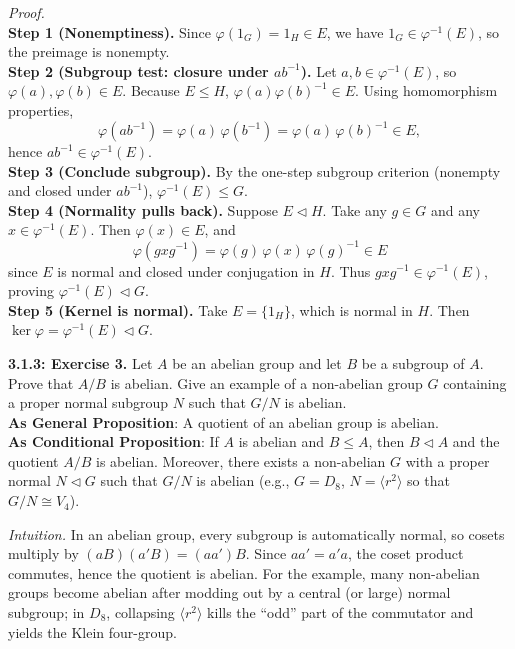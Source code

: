\documentclass[12pt]{article}
\theoremstyle{definition}
\begin{document}
\dotfill

\emph{Proof.}\\
\textbf{Step 1 (Nonemptiness).} Since $\varphi(1_G)=1_H\in E$, we have $1_G\in \varphi^{-1}(E)$, so the preimage is nonempty.\\
\textbf{Step 2 (Subgroup test: closure under $ab^{-1}$).} Let $a,b\in \varphi^{-1}(E)$, so $\varphi(a),\varphi(b)\in E$. Because $E\le H$, $\varphi(a)\varphi(b)^{-1}\in E$. Using homomorphism properties,
\[
\varphi(ab^{-1})=\varphi(a)\,\varphi(b^{-1})=\varphi(a)\,\varphi(b)^{-1}\in E,
\]
hence $ab^{-1}\in \varphi^{-1}(E)$.\\
\textbf{Step 3 (Conclude subgroup).} By the one-step subgroup criterion (nonempty and closed under $ab^{-1}$), $\varphi^{-1}(E)\le G$.\\
\textbf{Step 4 (Normality pulls back).} Suppose $E\lhd H$. Take any $g\in G$ and any $x\in \varphi^{-1}(E)$. Then $\varphi(x)\in E$, and
\[
\varphi(gxg^{-1})=\varphi(g)\,\varphi(x)\,\varphi(g)^{-1}\in E
\]
since $E$ is normal and closed under conjugation in $H$. Thus $gxg^{-1}\in \varphi^{-1}(E)$, proving $\varphi^{-1}(E)\lhd G$.\\
\textbf{Step 5 (Kernel is normal).} Take $E=\{1_H\}$, which is normal in $H$. Then $\ker\varphi=\varphi^{-1}(E)\lhd G$.\\

\newpage

\newpage

\noindent \textbf{3.1.3: Exercise 3.} Let $A$ be an abelian group and let $B$ be a subgroup of $A$. Prove that $A/B$ is abelian. Give an example of a non-abelian group $G$ containing a proper normal subgroup $N$ such that $G/N$ is abelian.\\ %

\noindent\textbf{As General Proposition}: A quotient of an abelian group is abelian.\\

\noindent \textbf{As Conditional Proposition}: If $A$ is abelian and $B\le A$, then $B\lhd A$ and the quotient $A/B$ is abelian. Moreover, there exists a non-abelian $G$ with a proper normal $N\lhd G$ such that $G/N$ is abelian (e.g., $G=D_8$, $N=\langle r^2\rangle$ so that $G/N\cong V_4$).\\

\newpage

\dotfill

\emph{Intuition.} In an abelian group, every subgroup is automatically normal, so cosets multiply by $(aB)(a'B)=(aa')B$. Since $aa'=a'a$, the coset product commutes, hence the quotient is abelian. For the example, many non-abelian groups become abelian after modding out by a central (or large) normal subgroup; in $D_8$, collapsing $\langle r^2\rangle$ kills the “odd” part of the commutator and yields the Klein four-group.\\
\end{document}

